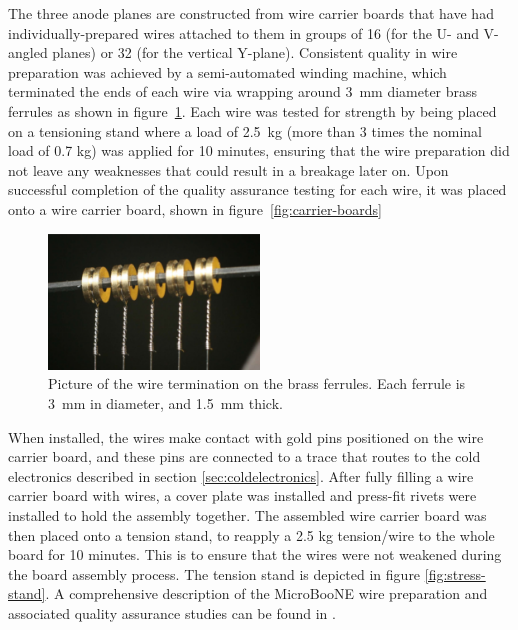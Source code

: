 The three anode planes are constructed from wire carrier boards that have had individually-prepared wires attached to them in groups of 16 (for the U- and V- angled planes) or 32 (for the vertical Y-plane).  Consistent quality in wire preparation was achieved by a semi-automated winding machine, which terminated the ends of each wire via wrapping around 3~mm diameter brass ferrules as shown in figure~\ref{fig:ferrules}. Each wire was tested for strength by being placed on a tensioning stand where a load of 2.5~kg (more than 3 times the nominal load of 0.7 kg) was applied for 10 minutes, ensuring that the wire preparation did not leave any weaknesses that could result in a breakage later on.  Upon successful completion of the quality assurance testing for each wire, it was placed onto a wire carrier board, shown in figure~\ref{fig:carrier-boards}

\begin{figure}[htb]
\centering
\includegraphics[width=0.5\textwidth]{figures/wire-twist.pdf}
\caption{Picture of the wire termination on the brass ferrules.  Each ferrule is 3~mm in diameter, and 1.5~mm thick.}
\label{fig:ferrules}
\end{figure}


When installed, the wires make contact with gold pins positioned on the wire carrier board, and these pins are connected to a trace that routes to the cold electronics described in section \ref{sec:coldelectronics}.  After fully filling a wire carrier board with wires, a cover plate was installed and press-fit rivets were installed to hold the assembly together. The assembled wire carrier board was then placed onto a tension stand, to reapply a 2.5 kg tension/wire to the whole board for 10 minutes. This is to ensure that the wires were not weakened during the board assembly process. The tension stand is depicted in figure \ref{fig:stress-stand}.   A comprehensive description of the MicroBooNE wire preparation and associated quality assurance studies can be found in \cite{Acciarri:2016ugk}.%

